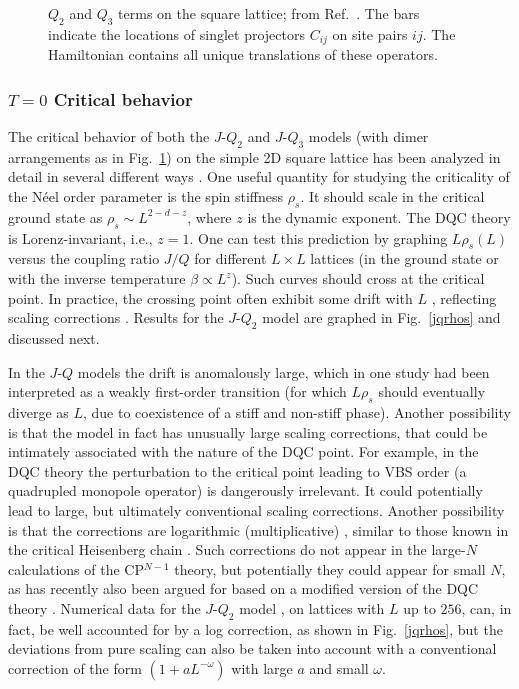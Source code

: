 \documentclass[range]{ar2e}
\begin{document}
\begin{figure}
\centerline{}
\caption{$Q_2$ and $Q_3$ terms on the square lattice; from Ref.~\cite{Sandvik12}. The bars indicate the locations of singlet projectors 
$C_{ij}$ on site pairs $ij$. The Hamiltonian contains all unique translations of these operators.}
\label{qterms}
\end{figure}

\subsubsection{$T=0$ Critical behavior}

The critical behavior of both the $J$-$Q_2$ and $J$-$Q_3$ models (with dimer arrangements as in Fig.~\ref{qterms}) on the simple 2D square 
lattice has been analyzed in detail in several different ways \cite{Sandvik07,Jiang08,melko2008:jq,lou2009:sun,Sandvik10c}. One useful quantity 
for studying the criticality of the N\'eel order parameter is the spin stiffness $\rho_s$. It should scale in the critical ground state as 
$\rho_s \sim L^{2-d-z}$, where $z$ is the dynamic exponent. The DQC theory is Lorenz-invariant, i.e., $z=1$. One can test this prediction by graphing 
$L\rho_s(L)$ versus the coupling ratio $J/Q$ for different $L\times L$ lattices (in the ground state or with the inverse temperature $\beta \propto L^z$). 
Such curves should cross at the critical point. In practice, the crossing point often exhibit some drift with $L$ \cite{melko2008:jq}, reflecting scaling 
corrections \cite{Sandvik10c}. Results for the $J$-$Q_2$ model are graphed in Fig.~\ref{jqrhos} and discussed next.

In the $J$-$Q$ models the drift is anomalously large, which in one study \cite{Jiang08} had been interpreted as a weakly first-order transition (for which 
$L\rho_s$ should eventually diverge as $L$, due to coexistence of a stiff and non-stiff phase). Another possibility is that the model in fact has unusually
large scaling corrections, that could be intimately associated with the nature of the DQC point. For example, in the DQC theory the perturbation to the 
critical point leading to VBS order (a quadrupled monopole operator) is dangerously irrelevant. It could potentially lead to large, but ultimately conventional
scaling corrections. Another possibility is that the corrections are logarithmic (multiplicative) \cite{Sandvik10c,banerjee2010:log}, similar to those known 
in the critical Heisenberg chain \cite{Giamarchi89}. Such corrections do not appear in the large-$N$ calculations of the CP$^{N-1}$ theory, but potentially they could 
appear for small $N$, as has recently also been argued for based on a modified version of the DQC theory \cite{Nogueira11}. Numerical data for the $J$-$Q_2$ 
model \cite{Sandvik10c}, on lattices with $L$ up to $256$, can, in fact, be well accounted for by a log correction, as shown in Fig.~\ref{jqrhos}, but the 
deviations from pure scaling can also be taken into account with a conventional correction of the form $(1+aL^{-\omega})$ with large $a$ and small $\omega$.
\end{document}
